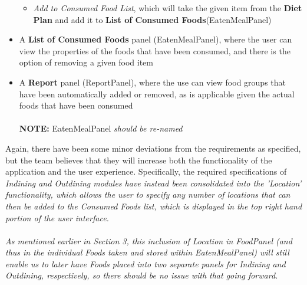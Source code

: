 \documentclass{article}
\begin{document}
\begin{itemize}
\begin{itemize}
        \item \textit{Add to Consumed Food List}, which will take the given item from the \textbf{Diet Plan} and add it to \textbf{List of Consumed Foods}(EatenMealPanel)
    \end{itemize}
  \item A \textbf{List of Consumed Foods} panel (EatenMealPanel), where the user can view the properties of the foods that have been consumed, and there is the option of removing a given food item
  \item A \textbf{Report} panel (ReportPanel), where the use can view food groups that have been automatically added or removed, as is applicable given the actual foods that have been consumed\\\\
  \textbf{NOTE: } EatenMealPanel \textit{should be re-named}\\
\end{itemize}
Again, there have been some minor deviations from the requirements as specified, but the team believes that they will increase both the functionality of the application and the user experience. Specifically, the required specifications of \em Indining \em and \em Outdining \em modules have instead been consolidated into the 'Location' functionality, which allows the user to specify any number of locations that can then be added to the \em Consumed Foods \em list, which is displayed in the top right hand portion of the user interface.
\\\\
As mentioned earlier in Section 3, this inclusion of Location in FoodPanel (and thus in the individual Foods taken and stored within EatenMealPanel) will still enable us to later have Foods placed into two separate panels for \em Indining \em and \em Outdining\em, respectively, so there should be no issue with that going forward.\\
\end{document}
